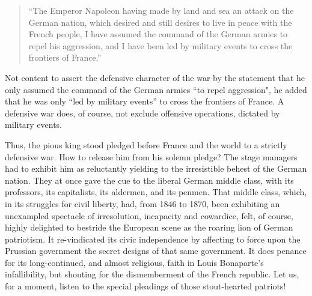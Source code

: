 \documentclass{book}
\begin{document}
\begin{quote}

``The Emperor Napoleon having made by land and sea an attack on the German
nation, which desired and still desires to live in peace with the French
people, I have assumed the command of the German armies to repel his
aggression, and I have been led by military events to cross the frontiers
of France.''

\end{quote}

Not content to assert the defensive character of the war by the statement
that he only assumed the command of the German armies “to repel
aggression", he added that he was only “led by military events” to cross
the frontiers of France. A defensive war does, of course, not exclude
offensive operations, dictated by military events.

Thus, the pious king stood pledged before France and the world to
a strictly defensive war. How to release him from his solemn pledge? The
stage managers had to exhibit him as reluctantly yielding to the
irresistible behest of the German nation. They at once gave the cue to the
liberal German middle class, with its professors, its capitalists, its
aldermen, and its penmen. That middle class, which, in its struggles for
civil liberty, had, from 1846 to 1870, been exhibiting an unexampled
spectacle of irresolution, incapacity and cowardice, felt, of course,
highly delighted to bestride the European scene as the roaring lion of
German patriotism. It re-vindicated its civic independence by affecting to
force upon the Prussian government the secret designs of that same
government. It does penance for its long-continued, and almost religious,
faith in Louis Bonaparte’s infallibility, but shouting for the
dismemberment of the French republic. Let us, for a moment, listen to the
special pleadings of those stout-hearted patriots!
\end{document}

